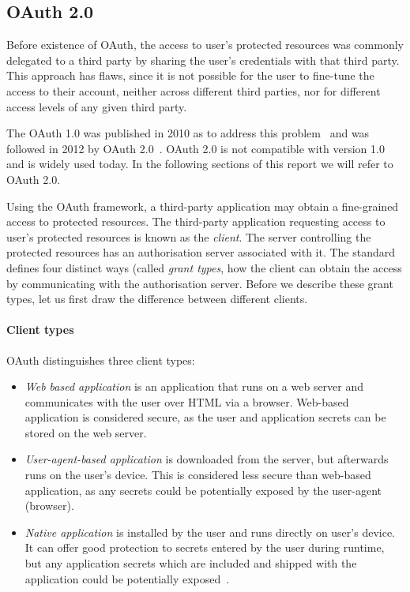\subsection{OAuth 2.0} \label{OAuth_2}

Before existence of OAuth, the access to user's protected resources was commonly delegated to a third party by sharing the user's credentials with that third party. This approach has flaws, since it is not possible for the user to fine-tune the access to their account, neither across different third parties, nor for different access levels of any given third party. 

The OAuth 1.0 was published in 2010 as to address this problem~\cite{Hammer-Lahav2010TheProtocol} and was followed in 2012 by OAuth 2.0~\cite{Hardt2012TheFramework}. OAuth 2.0 is not compatible with version 1.0 and is widely used today. In the following sections of this report we will refer to OAuth 2.0.

Using the OAuth framework, a third-party application may obtain a fine-grained access to protected resources. The third-party application requesting access to user's protected resources is known as the \textit{client}. The server controlling the protected resources has an authorisation server associated with it. The standard defines four distinct ways (called \textit{grant types}, how the client can obtain the access by communicating with the authorisation server. Before we describe these grant types, let us first draw the difference between different clients.

\paragraph{Client types} OAuth distinguishes three client types:
\begin{itemize}[noitemsep]
    \item \textit{Web based application} is an application that runs on a web server and communicates with the user over HTML via a browser. Web-based application is considered secure, as the user and application secrets can be stored on the web server.
    \item \textit{User-agent-based application} is downloaded from the server, but afterwards runs on the user's device. This is considered less secure than web-based application, as any secrets could be potentially exposed by the user-agent (browser).
    \item \textit{Native application} is installed by the user and runs directly on user's device. It can offer good protection to secrets entered by the user during runtime, but any application secrets which are included and shipped with the application could be potentially exposed~\cite{Hardt2012TheFramework}.
\end{itemize}

